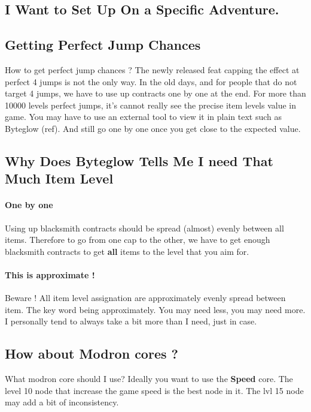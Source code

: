 \documentclass{article}
\begin{document}
\subsection{I Want to Set Up On a Specific Adventure.}



\subsection{Getting Perfect Jump Chances}
\label{sec:upgradeIlvl}

How to get perfect jump chances ?
The newly released feat capping the effect at perfect 4 jumps is not the only way.
In the old days, and for people that do not target 4 jumps, we have to use up contracts one by one at the end.
For more than 10000 levels perfect jumps, it's cannot really see the precise item levels value in game.
You may have to use an external tool to view it in plain text such as Byteglow (ref).
And still go one by one once you get close to the expected value.

\subsection{Why Does Byteglow Tells Me I need That Much Item Level}

\paragraph{One by one}

Using up blacksmith contracts should be spread (almost) evenly between all items.
Therefore to go from one cap to the other, we have to get enough blacksmith contracts to get \textbf{all} items to the level that you aim for.

\paragraph{This is approximate !}
Beware !
All item level assignation are approximately evenly spread between item.
The key word being approximately.
You may need less, you may need more.
I personally tend to always take a bit more than I need, just in case.

\subsection{How about Modron cores ?}

What modron core should I use?
Ideally you want to use the \textbf{Speed} core.
The level 10 node that increase the game speed is the best node in it.
The lvl 15 node may add a bit of inconsistency.
\end{document}
